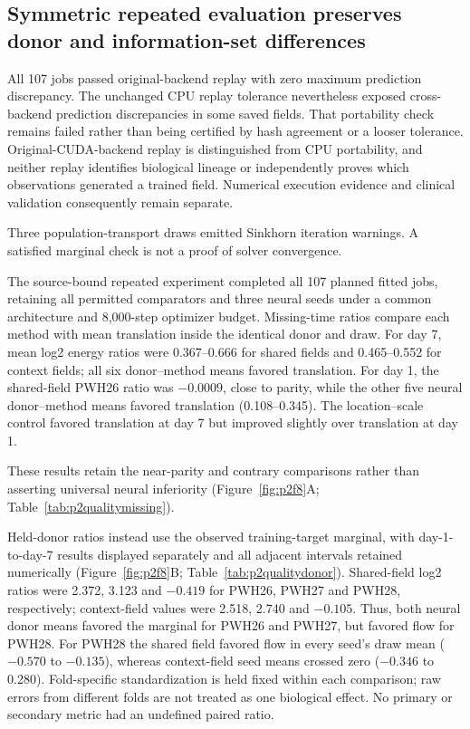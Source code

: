 

\subsection{Symmetric repeated evaluation preserves donor and information-set differences}

All 107 jobs passed original-backend replay with zero maximum prediction discrepancy. The unchanged CPU replay tolerance nevertheless exposed cross-backend prediction discrepancies in some saved fields. That portability check remains failed rather than being certified by hash agreement or a looser tolerance. Original-CUDA-backend replay is distinguished from CPU portability, and neither replay identifies biological lineage or independently proves which observations generated a trained field. Numerical execution evidence and clinical validation consequently remain separate.

Three population-transport draws emitted Sinkhorn iteration warnings. A satisfied marginal check is not a proof of solver convergence.

The source-bound repeated experiment completed all 107 planned fitted jobs, retaining all permitted comparators and three neural seeds under a common architecture and 8,000-step optimizer budget. Missing-time ratios compare each method with mean translation inside the identical donor and draw. For day 7, mean log2 energy ratios were 0.367--0.666 for shared fields and 0.465--0.552 for context fields; all six donor--method means favored translation. For day 1, the shared-field PWH26 ratio was $-0.0009$, close to parity, while the other five neural donor--method means favored translation (0.108--0.345). The location--scale control favored translation at day 7 but improved slightly over translation at day 1.

These results retain the near-parity and contrary comparisons rather than asserting universal neural inferiority (Figure~\ref{fig:p2f8}A\label{call:p2f8}; Table~\ref{tab:p2qualitymissing}).

Held-donor ratios instead use the observed training-target marginal, with day-1-to-day-7 results displayed separately and all adjacent intervals retained numerically (Figure~\ref{fig:p2f8}B; Table~\ref{tab:p2qualitydonor}). Shared-field log2 ratios were 2.372, 3.123 and $-0.419$ for PWH26, PWH27 and PWH28, respectively; context-field values were 2.518, 2.740 and $-0.105$. Thus, both neural donor means favored the marginal for PWH26 and PWH27, but favored flow for PWH28. For PWH28 the shared field favored flow in every seed's draw mean ($-0.570$ to $-0.135$), whereas context-field seed means crossed zero ($-0.346$ to 0.280). Fold-specific standardization is held fixed within each comparison; raw errors from different folds are not treated as one biological effect. No primary or secondary metric had an undefined paired ratio.

